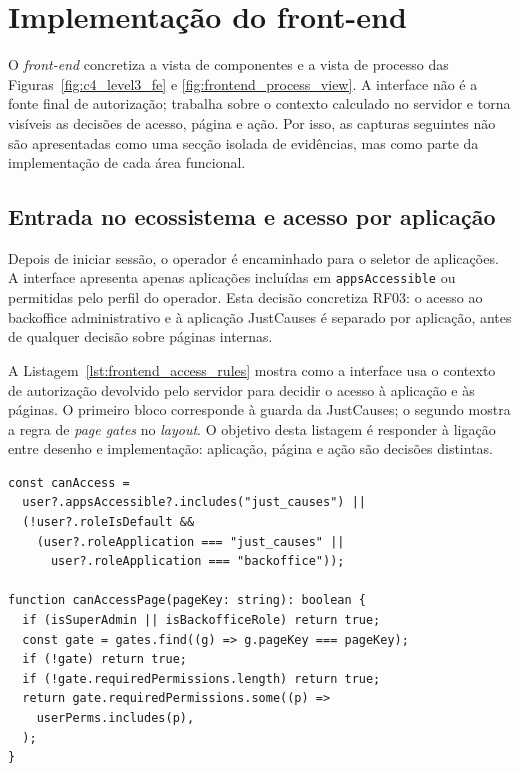 
\section{Implementação do front-end}
\label{sec:impl_frontend}

O \textit{front-end} concretiza a vista de componentes e a vista de processo das Figuras~\ref{fig:c4_level3_fe} e \ref{fig:frontend_process_view}. A interface não é a fonte final de autorização; trabalha sobre o contexto calculado no servidor e torna visíveis as decisões de acesso, página e ação. Por isso, as capturas seguintes não são apresentadas como uma secção isolada de evidências, mas como parte da implementação de cada área funcional.

\subsection{Entrada no ecossistema e acesso por aplicação}
\label{subsec:impl_app_selector}

Depois de iniciar sessão, o operador é encaminhado para o seletor de aplicações. A interface apresenta apenas aplicações incluídas em \texttt{appsAccessible} ou permitidas pelo perfil do operador. Esta decisão concretiza RF03: o acesso ao backoffice administrativo e à aplicação JustCauses é separado por aplicação, antes de qualquer decisão sobre páginas internas.

A Listagem~\ref{lst:frontend_access_rules} mostra como a interface usa o contexto de autorização devolvido pelo servidor para decidir o acesso à aplicação e às páginas. O primeiro bloco corresponde à guarda da JustCauses; o segundo mostra a regra de \textit{page gates} no \textit{layout}. O objetivo desta listagem é responder à ligação entre desenho e implementação: aplicação, página e ação são decisões distintas.

\begin{lstlisting}[float, caption={Decisão de acesso a aplicação e página no front-end}, label={lst:frontend_access_rules}]
const canAccess =
  user?.appsAccessible?.includes("just_causes") ||
  (!user?.roleIsDefault &&
    (user?.roleApplication === "just_causes" ||
      user?.roleApplication === "backoffice"));

function canAccessPage(pageKey: string): boolean {
  if (isSuperAdmin || isBackofficeRole) return true;
  const gate = gates.find((g) => g.pageKey === pageKey);
  if (!gate) return true;
  if (!gate.requiredPermissions.length) return true;
  return gate.requiredPermissions.some((p) =>
    userPerms.includes(p),
  );
}
\end{lstlisting}

